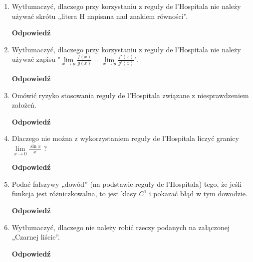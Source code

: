 \documentclass[12pt,a4paper]{article}
\theoremstyle{break}
\newcommand{\Odp}[1]{
		\begin{mdframed}[style=zadanie]
			\textbf{Odpowiedź}\\
			#1
		\end{mdframed}
	}
\begin{document}
\begin{enumerate}[1.]
{	}
	
	\item Wytłumaczyć, dlaczego przy korzystaniu z reguły de l’Hospitala nie należy używać skrótu „litera H napisana nad znakiem równości”.
	\Odp{
	
	}
	
	\item Wytłumaczyć, dlaczego przy korzystaniu z reguły de l’Hospitala nie należy używać zapisu "$\lim\limits_{x\rightarrow p} \frac{f(x)}{g(x)} = \lim\limits_{x\rightarrow p} \frac{f'(x)}{g'(x)}$".
	\Odp{
	
	}
	
	\item Omówić ryzyko stosowania reguły de l’Hospitala związane z niesprawdzeniem założeń.
	\Odp{
	
	}
	
	\item Dlaczego nie można z wykorzystaniem reguły de l’Hospitala liczyć granicy $\lim\limits_{x\rightarrow0}\frac{\sin x}{x}$ ?
	\Odp{
	
	}
	
	\item Podać fałszywy „dowód” (na podstawie reguły de l’Hospitala) tego, że jeśli funkcja jest różniczkowalna, to jest klasy $C^1$ i pokazać błąd w tym dowodzie.
	\Odp{
	
	}
	
	\item Wytłumaczyć, dlaczego nie należy robić rzeczy podanych na załączonej „Czarnej liście”.
	\Odp{
	
	}
	
	\end{enumerate}
	
\end{document}
